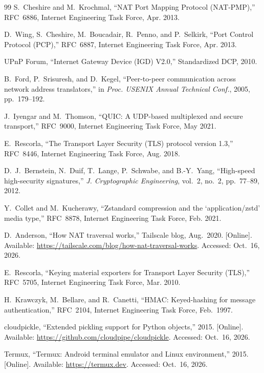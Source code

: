 {\begin{thebibliography}{99}
 S.~Cheshire and M.~Krochmal, ``NAT Port Mapping Protocol (NAT-PMP),'' RFC~6886, Internet Engineering Task Force, Apr. 2013.

 D.~Wing, S.~Cheshire, M.~Boucadair, R.~Penno, and P.~Selkirk, ``Port Control Protocol (PCP),'' RFC~6887, Internet Engineering Task Force, Apr. 2013.

 UPnP Forum, ``Internet Gateway Device (IGD) V2.0,'' Standardized DCP, 2010.

 B.~Ford, P.~Srisuresh, and D.~Kegel, ``Peer-to-peer communication across network address translators,'' in \textit{Proc. USENIX Annual Technical Conf.}, 2005, pp.~179--192.

 J.~Iyengar and M.~Thomson, ``QUIC: A UDP-based multiplexed and secure transport,'' RFC~9000, Internet Engineering Task Force, May 2021.

 E.~Rescorla, ``The Transport Layer Security (TLS) protocol version 1.3,'' RFC~8446, Internet Engineering Task Force, Aug. 2018.

 D.~J.~Bernstein, N.~Duif, T.~Lange, P.~Schwabe, and B.-Y.~Yang, ``High-speed high-security signatures,'' \textit{J. Cryptographic Engineering}, vol.~2, no.~2, pp.~77--89, 2012.

 Y.~Collet and M.~Kucherawy, ``Zstandard compression and the `application/zstd' media type,'' RFC~8878, Internet Engineering Task Force, Feb. 2021.

 D.~Anderson, ``How NAT traversal works,'' Tailscale blog, Aug.\ 2020. [Online]. Available: \url{https://tailscale.com/blog/how-nat-traversal-works}. Accessed: Oct.~16, 2026.

 E.~Rescorla, ``Keying material exporters for Transport Layer Security (TLS),'' RFC~5705, Internet Engineering Task Force, Mar. 2010.

 H.~Krawczyk, M.~Bellare, and R.~Canetti, ``HMAC: Keyed-hashing for message authentication,'' RFC~2104, Internet Engineering Task Force, Feb.\ 1997.

 cloudpickle, ``Extended pickling support for Python objects,'' 2015. [Online]. Available: \url{https://github.com/cloudpipe/cloudpickle}. Accessed: Oct.~16, 2026.

 Termux, ``Termux: Android terminal emulator and Linux environment,'' 2015. [Online]. Available: \url{https://termux.dev}. Accessed: Oct.~16, 2026.


\end{thebibliography}}

